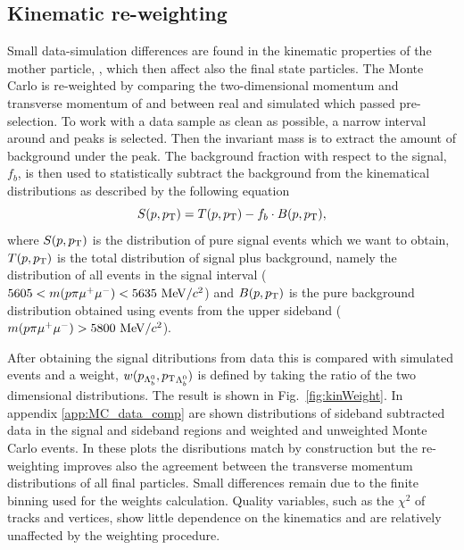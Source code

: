 \subsection{Kinematic re-weighting}
\label{sec:kinWeight}

Small data-simulation differences are found in the kinematic properties of the mother particle, \Lb,
which then affect also the final state particles. The Monte Carlo is re-weighted by 
comparing the two-dimensional momentum and transverse momentum of \Lb and \Lz between
real and simulated \Lb\to\jpsi\Lz which passed pre-selection.
To work with a data sample as clean as possible, a narrow interval around \jpsi and \Lb peaks is selected.
Then the \Lb invariant mass is to extract the amount of background under the peak.
The background fraction with respect to the signal, $f_b$, is then used to statistically
subtract the background from the kinematical distributions as described by the following equation
%
\begin{equation}
S(p,\mbox{$p_{\rm T}$}) = T(p,\mbox{$p_{\rm T}$}) - f_b\cdot B(p,\mbox{$p_{\rm T}$}),
\end{equation}
\noindent
where $S(p,\mbox{$p_{\rm T}$})$ is the distribution of pure signal events which we want to obtain, $T(p,\mbox{$p_{\rm T}$})$ is the total
distribution of signal plus background, namely the distribution of all events in the signal interval
($5605 < m(p\pi\mumu) < 5635 \mevcc$) and $B(p,\mbox{$p_{\rm T}$})$ is the pure background
distribution obtained using events from the upper sideband ($m(p\pi\mumu) > 5800 \mevcc$).

After obtaining the signal ditributions from data this is compared with \Lb\to\Lz\mumu simulated events
and a weight, $w(p_{\Lambda^0_b},\mbox{$p_{\rm T}$}_{\Lambda^0_b})$ is defined by taking the ratio of the two dimensional distributions.
The result is shown in Fig.~\ref{fig:kinWeight}. In appendix \ref{app:MC_data_comp} are shown distributions
of sideband subtracted data in the signal and sideband regions and weighted and unweighted Monte Carlo events.
In these plots the \Lb disributions match by construction but the re-weighting improves also the agreement 
between the transverse momentum distributions of all final particles. Small differences remain due to
the finite binning used for the weights calculation. Quality variables, such as the $\chi^2$ of tracks
and vertices, show little dependence on the kinematics and are relatively unaffected by the weighting procedure.

